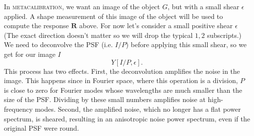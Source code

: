 \documentclass[twocolumn]{openjournal}
\makeatletter
\newcommand{\mcal}{\textsc{metacalibration}\@\xspace}
\makeatother
\begin{document}
In \mcal, we want an image of the object $G$, but with a small shear $\epsilon$ applied.
A shape measurement of this image of the object will be used to compute the response
$\mathbf{R}$ above. For now let's consider a small positive shear $\epsilon$
(The exact direction doesn't matter so we will drop the typical $1,2$
subscripts.) We need to deconvolve the PSF (i.e. $I/P$) before applying this small
shear, so we get for our image $I$
\begin{equation} \label{eq:yop}
Y[I/P,\epsilon].
\end{equation}
This process has two effects. First, the deconvolution amplifies the noise in the
image. This happens since in Fourier space, where this operation is a division, $P$ is
close to zero for Fourier modes whose wavelengths are much smaller than the size of the
PSF. Dividing by these small numbers amplifies noise at high-frequency modes. Second,
the amplified noise, which no longer has a flat power spectrum, is sheared, resulting
in an anisotropic noise power spectrum, even if the original PSF were round.
\end{document}
